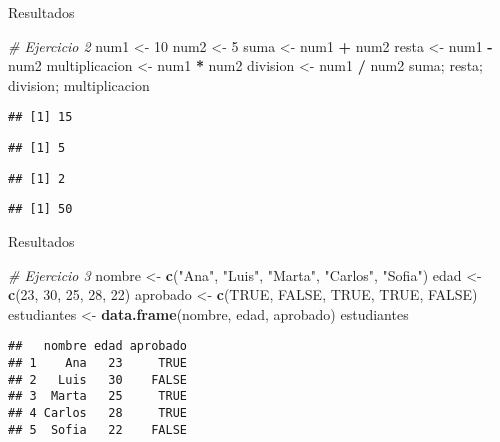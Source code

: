 \documentclass[
  ignorenonframetext,
]{beamer}
\newenvironment{Shaded}{\begin{snugshade}}{\end{snugshade}}
\newcommand{\CommentTok}[1]{\textcolor[rgb]{0.56,0.35,0.01}{\textit{#1}}}
\newcommand{\ConstantTok}[1]{\textcolor[rgb]{0.56,0.35,0.01}{#1}}
\newcommand{\DecValTok}[1]{\textcolor[rgb]{0.00,0.00,0.81}{#1}}
\newcommand{\FunctionTok}[1]{\textcolor[rgb]{0.13,0.29,0.53}{\textbf{#1}}}
\newcommand{\NormalTok}[1]{#1}
\newcommand{\OtherTok}[1]{\textcolor[rgb]{0.56,0.35,0.01}{#1}}
\newcommand{\SpecialCharTok}[1]{\textcolor[rgb]{0.81,0.36,0.00}{\textbf{#1}}}
\newcommand{\StringTok}[1]{\textcolor[rgb]{0.31,0.60,0.02}{#1}}
\begin{document}
\begin{frame}[fragile]{Resultados}
\label{resultados-1}
\begin{Shaded}
\begin{Highlighting}[]
\CommentTok{\# Ejercicio 2}
\NormalTok{num1 }\OtherTok{\textless{}{-}} \DecValTok{10}
\NormalTok{num2 }\OtherTok{\textless{}{-}} \DecValTok{5}
\NormalTok{suma }\OtherTok{\textless{}{-}}\NormalTok{ num1 }\SpecialCharTok{+}\NormalTok{ num2}
\NormalTok{resta }\OtherTok{\textless{}{-}}\NormalTok{ num1 }\SpecialCharTok{{-}}\NormalTok{ num2}
\NormalTok{multiplicacion }\OtherTok{\textless{}{-}}\NormalTok{ num1 }\SpecialCharTok{*}\NormalTok{ num2}
\NormalTok{division }\OtherTok{\textless{}{-}}\NormalTok{ num1 }\SpecialCharTok{/}\NormalTok{ num2}
\NormalTok{suma; resta; division; multiplicacion}
\end{Highlighting}
\end{Shaded}

\begin{verbatim}
## [1] 15
\end{verbatim}

\begin{verbatim}
## [1] 5
\end{verbatim}

\begin{verbatim}
## [1] 2
\end{verbatim}

\begin{verbatim}
## [1] 50
\end{verbatim}
\end{frame}

\begin{frame}[fragile]{Resultados}
\label{resultados-2}
\begin{Shaded}
\begin{Highlighting}[]
\CommentTok{\# Ejercicio 3}
\NormalTok{nombre }\OtherTok{\textless{}{-}} \FunctionTok{c}\NormalTok{(}\StringTok{"Ana"}\NormalTok{, }\StringTok{"Luis"}\NormalTok{, }\StringTok{"Marta"}\NormalTok{, }\StringTok{"Carlos"}\NormalTok{, }\StringTok{"Sofia"}\NormalTok{)}
\NormalTok{edad }\OtherTok{\textless{}{-}} \FunctionTok{c}\NormalTok{(}\DecValTok{23}\NormalTok{, }\DecValTok{30}\NormalTok{, }\DecValTok{25}\NormalTok{, }\DecValTok{28}\NormalTok{, }\DecValTok{22}\NormalTok{)}
\NormalTok{aprobado }\OtherTok{\textless{}{-}} \FunctionTok{c}\NormalTok{(}\ConstantTok{TRUE}\NormalTok{, }\ConstantTok{FALSE}\NormalTok{, }\ConstantTok{TRUE}\NormalTok{, }\ConstantTok{TRUE}\NormalTok{, }\ConstantTok{FALSE}\NormalTok{)}
\NormalTok{estudiantes }\OtherTok{\textless{}{-}} \FunctionTok{data.frame}\NormalTok{(nombre, edad, aprobado)}
\NormalTok{estudiantes}
\end{Highlighting}
\end{Shaded}

\begin{verbatim}
##   nombre edad aprobado
## 1    Ana   23     TRUE
## 2   Luis   30    FALSE
## 3  Marta   25     TRUE
## 4 Carlos   28     TRUE
## 5  Sofia   22    FALSE
\end{verbatim}
\end{frame}
\end{document}
